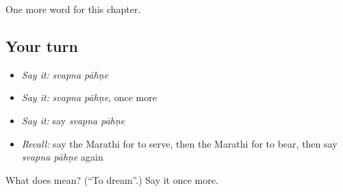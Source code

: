 \begin{grammarlens}[title={What you've built}]
One more word for this chapter.
\end{grammarlens}

\subsection*{Your turn}
\begin{itemize}
\raggedright
  \item \emph{Say it:} \emph{svapna pāhṇe}
  \item \emph{Say it:} \emph{svapna pāhṇe}, once more
  \item \emph{Say it:} say \emph{svapna pāhṇe}
  \item \emph{Recall:} say the Marathi for to serve, then the Marathi for to bear, then say \emph{svapna pāhṇe} again
\end{itemize}

\begin{tcolorbox}[breakable,colback=teal!4,colframe=teal!35!black,title={Before you move on}]
What does   mean? (\textquotedblleft{}To dream\textquotedblright{}.) Say it once more.
\end{tcolorbox}

